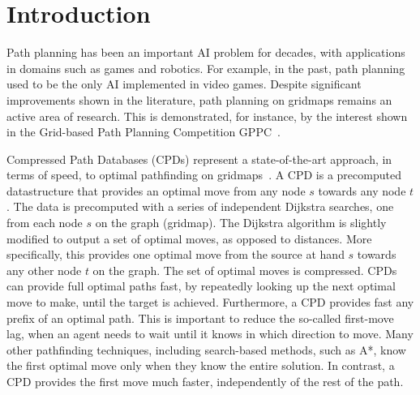 \section{Introduction}





Path planning has been an important AI problem for decades, with applications in domains such as games and robotics. For example, in the past, path planning used to be the only AI implemented in video games. Despite significant improvements shown in the literature, path planning on gridmaps remains an active area of research. This is demonstrated, for instance, by the interest shown in the Grid-based Path Planning Competition GPPC~\cite{DBLP:conf/socs/SturtevantTTUKS15}.

Compressed Path Databases (CPDs) represent a state-of-the-art approach, in terms of speed, to optimal pathfinding on gridmaps~\cite{DBLP:conf/socs/SturtevantTTUKS15,DBLP:conf/aips/SalvettiBGHS18}. A CPD is a precomputed datastructure that provides an optimal move from any node $s$ towards any node $t$. The data is precomputed with a series of independent Dijkstra searches, one from each node $s$ on the graph (gridmap). The Dijkstra algorithm is slightly modified to output a set of optimal moves, as opposed to distances. More specifically, this provides one optimal move from the source at hand $s$ towards any other node $t$ on the graph. The set of optimal moves is compressed. CPDs can provide full optimal paths fast, by repeatedly looking up the next optimal move to make, until the target is achieved. Furthermore, a CPD provides fast any prefix of an optimal path. This is important to reduce the so-called first-move lag, when an agent needs to wait until it knows in which direction to move. Many other pathfinding techniques, including search-based methods, such as A*, know the first optimal move only when they know the entire solution. In contrast, a CPD provides the first move much faster, independently of the rest of the path.


